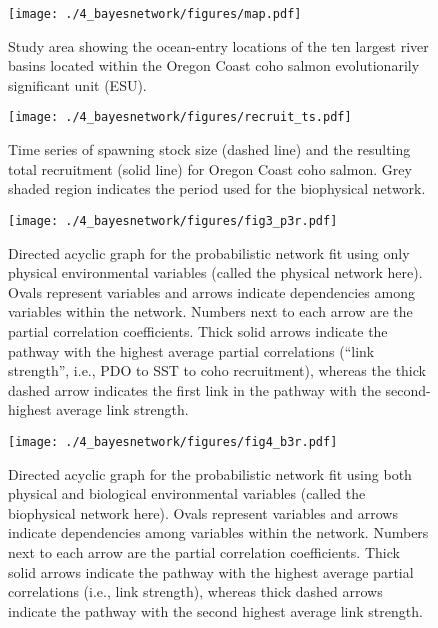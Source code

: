 \begin{figure}[htbp]
  \centering \texttt{[image: ./4\_bayesnetwork/figures/map.pdf]}
  \caption[Study area showing the ocean-entry locations of the ten largest river
           basins in the Oregon Coast ESU.]{Study area showing the ocean-entry
           locations of the ten largest river basins located within the Oregon
           Coast coho salmon evolutionarily significant unit (ESU).}
  \label{fig:bn:2}
\end{figure}

\begin{figure}[htbp]
  \centering \texttt{[image: ./4\_bayesnetwork/figures/recruit\_ts.pdf]}
  \caption[Time series of spawning stock size and the resulting
           total recruitment.]{Time series of spawning stock size (dashed line)
           and the resulting total recruitment (solid line) for Oregon Coast
           coho salmon. Grey shaded region indicates the period used for the
           biophysical network.}
  \label{fig:bn:3}
\end{figure}

\begin{figure}[htbp]
  \centering \texttt{[image: ./4\_bayesnetwork/figures/fig3\_p3r.pdf]}
  \caption[Directed acyclic graph for the probabilistic network fit using only
           physical environmental variables.]{Directed acyclic graph for the
           probabilistic network fit using only physical environmental variables
           (called the physical network here). Ovals represent variables and
           arrows indicate dependencies among variables within the network.
           Numbers next to each arrow are the partial correlation coefficients.
           Thick solid arrows indicate the pathway with the highest average
           partial correlations (``link strength'', i.e., PDO to SST to coho
           recruitment), whereas the thick dashed arrow indicates the first link
           in the pathway with the second-highest average link strength.}
  \label{fig:bn:4}
\end{figure}

\begin{figure}[htbp]
  \centering \texttt{[image: ./4\_bayesnetwork/figures/fig4\_b3r.pdf]}
  \caption[Directed acyclic graph for the probabilistic network fit using both
           physical and biological environmental variables.]{Directed acyclic
           graph for the probabilistic network fit using both physical and
           biological environmental variables (called the biophysical network
           here). Ovals represent variables and arrows indicate dependencies
           among variables within the network. Numbers next to each arrow are
           the partial correlation coefficients. Thick solid arrows indicate the
           pathway with the highest average partial correlations (i.e., link
           strength), whereas thick dashed arrows indicate the pathway with the
           second highest average link strength.}
  \label{fig:bn:5}
\end{figure}


